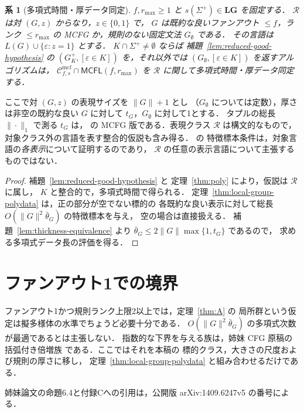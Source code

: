 \documentclass[11pt,a4paper]{ltjsarticle}
\numberwithin{equation}{section}
\theoremstyle{plain}
\newtheorem{corollary}[theorem]{系}
\theoremstyle{definition}
\theoremstyle{remark}
\newcommand{\Cmcf}[2]{\mathcal{C}^{\mathrm{mcf}}_{#1,#2}}
\newcommand{\eps}{\varepsilon}
\theoremstyle{plain}
\begin{document}
\begin{corollary}[多項式時間・厚データ同定]
\label{cor:iptd}
$f,r_{\max}\ge1$ と $s(\Sigma^+)\in\mathbf{LG}$ を固定する．
$\mathcal R$ は対 $(G,z)$ からなり，$z\in\{0,1\}$ で，
$G$ は既約な良いファンアウト $\le f$，ランク $\le r_{\max}$ の
MCFG か，規則のない固定文法 $G_\emptyset$ である．
その言語は $L(G)\cup\{\eps:z=1\}$ とする．
$K\cap\Sigma^+\ne\emptyset$ ならば
補題~\ref{lem:reduced-good-hypothesis} の
$(G^+_K,[\eps\in K])$ を，それ以外では
$(G_\emptyset,[\eps\in K])$ を返すアルゴリズムは，
$\Cmcf{f}{s}\cap\mathsf{MCFL}(f,r_{\max})$ を
$\mathcal R$ に関して多項式時間・厚データ同定する．
\end{corollary}
ここで対 $(G,z)$ の表現サイズを $\|G\|+1$ とし
（$G_\emptyset$ については定数），厚さは非空の既約な良い
$G$ に対して $t_G$，$G_\emptyset$ に対して1とする．
タプルの総長 $\|\cdot\|_1$ で測る $t_G$ は，
\cite[Definition~2.11]{EyraudHeinzYoshinaka2016} の
MCFG 版である．表現クラス $\mathcal R$ は構文的なもので，
対象クラス外の言語を表す整合的仮説も含み得る．
\cite[Definition~2.12]{EyraudHeinzYoshinaka2016} の
特徴標本条件は，対象言語の\emph{各表示}について証明するのであり，
$\mathcal R$ の任意の表示言語について主張するものではない．

\begin{proof}
補題~\ref{lem:reduced-good-hypothesis} と
定理~\ref{thm:poly} により，仮説は $\mathcal R$ に属し，
$K$ と整合的で，多項式時間で得られる．
定理~\ref{thm:local-group-polydata} は，正の部分が空でない標的の
各既約な良い表示に対して総長
$O(\|G\|^2\bar\theta_G)$ の特徴標本を与え，
空の場合は直接扱える．
補題~\ref{lem:thickness-equivalence} より
$\bar\theta_G\le2\|G\|\max\{1,t_G\}$ であるので，
求める多項式データ長の評価を得る．
\end{proof}

\section{ファンアウト1での境界}
\label{sec:fanout-one}

ファンアウト1かつ規則ランク上限2以上では，定理~\ref{thm:A} の
局所群という仮定は擬多様体の水準でちょうど必要十分である．
$O(\|G\|^2\bar\theta_G)$ の多項式次数が最適であるとは主張しない．
指数的な下界を与える族は，姉妹 CFG 原稿の括弧付き倍増族
\cite[Proposition~6.4]{kuriyamaCFG} である．ここではそれを本稿の
標的クラス，大きさの尺度および規則の厚さに移し，
定理~\ref{thm:local-group-polydata} と組み合わせるだけである．

姉妹論文の命題6.4と付録Cへの引用は，公開版
arXiv:1409.6247v5 の番号による．
\end{document}
